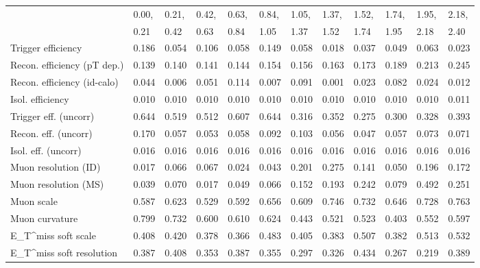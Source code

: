 \begin{tabular}{l|p{0.6cm}p{0.6cm}p{0.6cm}p{0.6cm}p{0.6cm}p{0.6cm}p{0.6cm}p{0.6cm}p{0.6cm}p{0.6cm}p{0.6cm}}
\hline
   & 0.00, & 0.21, & 0.42, & 0.63, & 0.84, & 1.05, & 1.37, & 1.52, & 1.74, & 1.95, & 2.18,  \\ 
   & 0.21 & 0.42 & 0.63 & 0.84 & 1.05 & 1.37 & 1.52 & 1.74 & 1.95 & 2.18 & 2.40  \\ 
\hline
Trigger efficiency                       & 0.186 & 0.054 & 0.106 & 0.058 & 0.149 & 0.058 & 0.018 & 0.037 & 0.049 & 0.063 & 0.023 \\
Recon. efficiency (pT dep.)              & 0.139 & 0.140 & 0.141 & 0.144 & 0.154 & 0.156 & 0.163 & 0.173 & 0.189 & 0.213 & 0.245 \\
Recon. efficiency (id-calo)              & 0.044 & 0.006 & 0.051 & 0.114 & 0.007 & 0.091 & 0.001 & 0.023 & 0.082 & 0.024 & 0.012 \\
Isol. efficiency                         & 0.010 & 0.010 & 0.010 & 0.010 & 0.010 & 0.010 & 0.010 & 0.010 & 0.010 & 0.010 & 0.011 \\
Trigger eff. (uncorr)                    & 0.644 & 0.519 & 0.512 & 0.607 & 0.644 & 0.316 & 0.352 & 0.275 & 0.300 & 0.328 & 0.393 \\
Recon. eff. (uncorr)                     & 0.170 & 0.057 & 0.053 & 0.058 & 0.092 & 0.103 & 0.056 & 0.047 & 0.057 & 0.073 & 0.071 \\
Isol. eff. (uncorr)                      & 0.016 & 0.016 & 0.016 & 0.016 & 0.016 & 0.016 & 0.016 & 0.016 & 0.016 & 0.016 & 0.016 \\
Muon resolution (ID)                     & 0.017 & 0.066 & 0.067 & 0.024 & 0.043 & 0.201 & 0.275 & 0.141 & 0.050 & 0.196 & 0.172 \\
Muon resolution (MS)                     & 0.039 & 0.070 & 0.017 & 0.049 & 0.066 & 0.152 & 0.193 & 0.242 & 0.079 & 0.492 & 0.251 \\
Muon scale                               & 0.587 & 0.623 & 0.529 & 0.592 & 0.656 & 0.609 & 0.746 & 0.732 & 0.646 & 0.728 & 0.763 \\
Muon curvature                           & 0.799 & 0.732 & 0.600 & 0.610 & 0.624 & 0.443 & 0.521 & 0.523 & 0.403 & 0.552 & 0.597 \\
E_{T}^{miss} soft scale                  & 0.408 & 0.420 & 0.378 & 0.366 & 0.483 & 0.405 & 0.383 & 0.507 & 0.382 & 0.513 & 0.532 \\
E_{T}^{miss} soft resolution             & 0.387 & 0.408 & 0.353 & 0.387 & 0.355 & 0.297 & 0.326 & 0.434 & 0.267 & 0.219 & 0.389 \\

\end{tabular}
